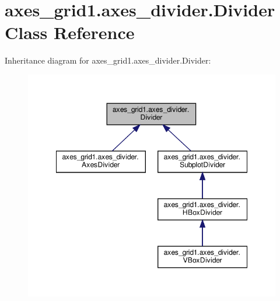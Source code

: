 \hypertarget{classaxes__grid1_1_1axes__divider_1_1Divider}{}\section{axes\+\_\+grid1.\+axes\+\_\+divider.\+Divider Class Reference}
\label{classaxes__grid1_1_1axes__divider_1_1Divider}


Inheritance diagram for axes\+\_\+grid1.\+axes\+\_\+divider.\+Divider\+:
\nopagebreak
\begin{figure}[H]
\begin{center}
\leavevmode
\includegraphics[width=348pt]{classaxes__grid1_1_1axes__divider_1_1Divider__inherit__graph}
\end{center}
\end{figure}
